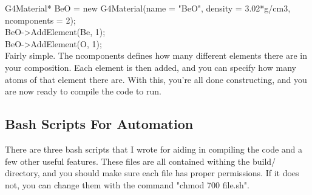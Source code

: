 \documentclass[%
12pt,
twoside,
reprint,
amsmath,amssymb,
aps,
]{article}
\begin{document}
	\noindent G4Material* BeO = new G4Material(name = "BeO", density = 3.02*g/cm3, \\
	\indent \indent \indent \indent \indent \indent \indent \indent \indent \indent \indent ncomponents = 2); \\
	BeO->AddElement(Be, 1); \\
	BeO->AddElement(O, 1); \\
	
	\noindent Fairly simple. The ncomponents defines how many different elements there are in your composition. Each element is then added, and you can specify how many atoms of that element there are. With this, you're all done constructing, and you are now ready to compile the code to run.
	
	\subsection{Bash Scripts For Automation}
	\par There are three bash scripts that I wrote for aiding in compiling the code and a few other useful features. These files are all contained withing the build/ directory, and you should make sure each file has proper permissions. If it does not, you can change them with the command "chmod 700 file.sh". 
	
\end{document}
